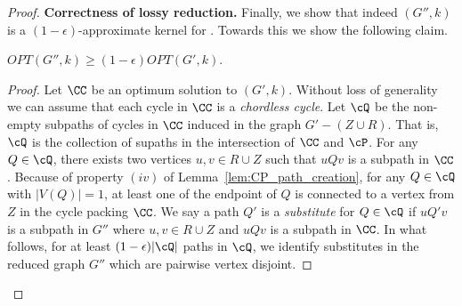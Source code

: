 \begin{proof}
\medskip
\noindent 
{\bf Correctness of lossy reduction.} Finally, we show that indeed $(G'',k)$ is a  
$(1-\epsilon)$-approximate kernel for \CP. Towards this we show the following claim. 

\begin{claim}
\label{claim:optCP}
$OPT(G'',k)\geq (1-\epsilon)OPT(G',k)$. 
\end{claim}
\begin{proof}
Let $\CC$ be an optimum solution to $(G',k)$. Without loss of generality we can assume that 
each cycle in $\CC$ is a {\em chordless cycle}.  
Let $\cQ$ be the non-empty subpaths of cycles in $\CC$ induced in the graph $G'-(Z\cup R)$. 
That is, $\cQ$ is the collection of supaths in the intersection of $\CC$ and $\cP$.
For any $Q\in \cQ$, 
there exists two vertices $u,v\in R \cup Z$ such that $uQv$ is a subpath in $\CC$.
Because of property $(iv)$ of Lemma~\ref{lem:CP_path_creation}, for any $Q\in \cQ$ with $\vert V(Q)\vert =1$, at least one of the endpoint of $Q$ is connected to a vertex from $Z$ in the cycle packing $\CC$. 
We say a path $Q'$ is a {\em substitute} for $Q\in \cQ$ if $uQ'v$ is a subpath in $G''$ where 
$u,v\in R\cup Z$ and $uQv$ is a subpath in $\CC$. 
In what follows,   for at least $(1-\epsilon)\vert \cQ\vert$ paths in $\cQ$, we identify substitutes in 
the reduced graph $G''$ which are pairwise vertex disjoint.





\end{proof}
\end{proof}
